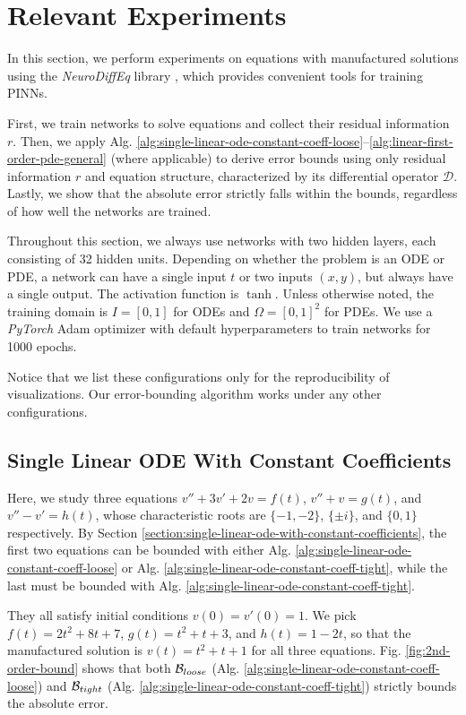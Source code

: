 \chapter{Relevant Experiments}\label{chapter:experiments}
    In this section, we perform experiments on equations with manufactured solutions using the \textit{NeuroDiffEq} library \citep{chen2020neurodiffeq}, which provides convenient tools for training PINNs. 

    First, we train networks to solve equations and collect their residual information $r$.
    Then, we apply Alg. \ref{alg:single-linear-ode-constant-coeff-loose}--\ref{alg:linear-first-order-pde-general} (where applicable) to derive error bounds using only residual information $r$ and equation structure, characterized by its differential operator $\mathcal {D}$. 
    Lastly, we show that the absolute error strictly falls within the bounds, regardless of how well the networks are trained.

    Throughout this section, we always use networks with two hidden layers, each consisting of 32 hidden units.
    Depending on whether the problem is an ODE or PDE, a network can have a single input $t$ or two inputs $(x, y)$, but always have a single output.
    The activation function is $\tanh$. 
    Unless otherwise noted, the training domain is $I=[0, 1]$ for ODEs and $\Omega=[0,1]^2$ for PDEs. 
    We use a \textit{PyTorch} Adam optimizer with default hyperparameters to train networks for 1000 epochs.

    Notice that we list these configurations only for the reproducibility of visualizations. 
    Our error-bounding algorithm works under any other configurations.

\section{Single Linear ODE With Constant Coefficients}
    Here, we study three equations $v'' + 3v' + 2v = f(t)$, $v'' + v = g(t)$, and $v'' - v' = h(t)$, whose characteristic roots are $\{-1, -2\}$, $\{\pm i\}$, and $\{0, 1\}$ respectively. 
    By Section \ref{section:single-linear-ode-with-constant-coefficients}, the first two equations can be bounded with either Alg. \ref{alg:single-linear-ode-constant-coeff-loose} or Alg. \ref{alg:single-linear-ode-constant-coeff-tight}, while the last must be bounded with Alg. \ref{alg:single-linear-ode-constant-coeff-tight}.

    They all satisfy initial conditions $v(0) = v'(0) = 1$. 
    We pick $f(t) =2t^2+8t+7$, $g(t) = t^2+t+3$, and $h(t)=1-2t$, so that the manufactured solution is $v(t) = t^2 + t + 1$ for all three equations.
    Fig. \ref{fig:2nd-order-bound} shows that both $\mathcal{B}_{loose}$ (Alg. \ref{alg:single-linear-ode-constant-coeff-loose}) and $\mathcal{B}_{tight}$ (Alg. \ref{alg:single-linear-ode-constant-coeff-tight}) strictly bounds the absolute error.
    
